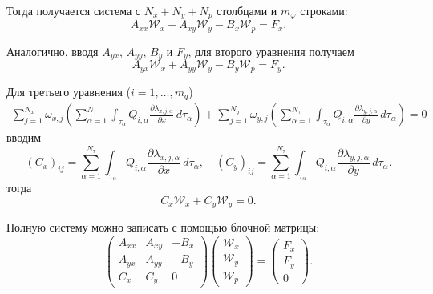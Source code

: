 \documentclass[a4paper,14pt]{extarticle}
\begin{document}
Тогда получается система с $N_x+N_y+N_p$ столбцами
и $m_\varphi$ строками:
\begin{equation}
	A_{xx}\mathcal W_x
	+
	A_{xy}\mathcal W_y
	-
	B_x\mathcal W_p
	=
	F_x.
\end{equation}


Аналогично, вводя $A_{yx}$, $A_{yy}$, $B_y$ и $F_y$,
для второго уравнения получаем
\begin{equation}
	A_{yx}\mathcal W_x
	+
	A_{yy}\mathcal W_y
	-
	B_y\mathcal W_p
	=
	F_y.
\end{equation}

Для третьего уравнения ($i=1,\ldots,m_q$)
\begin{equation}
	\begin{gathered}
		\sum_{j=1}^{N_x}
		\omega_{x,j}
		\left(
			\sum_{\alpha=1}^{N_\tau}
			\int_{\tau_\alpha}
			Q_{i,\alpha}
			\frac{\partial\lambda_{x,j,\alpha}}{\partial x}
			\,d\tau_\alpha
		\right)
		+
		\sum_{j=1}^{N_y}
		\omega_{y,j}
		\left(
			\sum_{\alpha=1}^{N_\tau}
			\int_{\tau_\alpha}
			Q_{i,\alpha}
			\frac{\partial\lambda_{y,j,\alpha}}{\partial y}
			\,d\tau_\alpha
		\right)
		=0
	\end{gathered}
\end{equation}
вводим
\begin{equation}
		(C_x)_{ij}
		=
		\sum_{\alpha=1}^{N_\tau}
		\int_{\tau_\alpha}
		Q_{i,\alpha}
		\frac{\partial\lambda_{x,j,\alpha}}{\partial x}
		\,d\tau_\alpha,\quad
		(C_y)_{ij}
		=
		\sum_{\alpha=1}^{N_\tau}
		\int_{\tau_\alpha}
		Q_{i,\alpha}
		\frac{\partial\lambda_{y,j,\alpha}}{\partial y}
		\,d\tau_\alpha.
\end{equation}
тогда
\begin{equation}
	C_x\mathcal W_x+C_y\mathcal W_y=0.
\end{equation}

Полную систему можно записать с помощью блочной матрицы:
\begin{equation}
	\begin{pmatrix}
		A_{xx} & A_{xy} & -B_x\\
		A_{yx} & A_{yy} & -B_y\\
		C_x & C_y & 0
	\end{pmatrix}
	\begin{pmatrix}
		\mathcal W_x\\
		\mathcal W_y\\
		\mathcal W_p
	\end{pmatrix}
	=
	\begin{pmatrix}
		F_x\\
		F_y\\
		0
	\end{pmatrix}.
\end{equation}
\end{document}
